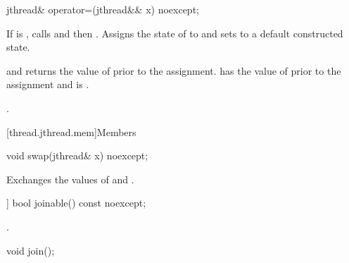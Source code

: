 %
\begin{itemdecl}
jthread& operator=(jthread&& x) noexcept;
\end{itemdecl}

\begin{itemdescr}
\pnum
\effects
If  is ,
calls  and then .
Assigns the state of  to 
and sets  to a default constructed state.

\pnum
\ensures
{}
and  returns the value of 
prior to the assignment.
 has the value of 
prior to the assignment
and  is .

\pnum
\returns {}.
\end{itemdescr}

[thread.jthread.mem]{Members}

%
\begin{itemdecl}
void swap(jthread& x) noexcept;
\end{itemdecl}

\begin{itemdescr}
\pnum
\effects Exchanges the values of  and .
\end{itemdescr}


%
\begin{itemdecl}
[[nodiscard]] bool joinable() const noexcept;
\end{itemdecl}

\begin{itemdescr}
\pnum
\returns {}.
\end{itemdescr}

%
\begin{itemdecl}
void join();
\end{itemdecl}

